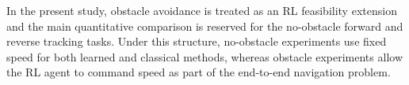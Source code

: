 In the present study, obstacle avoidance is treated as an RL feasibility extension and the main quantitative comparison is reserved for the no-obstacle forward and reverse tracking tasks. Under this structure, no-obstacle experiments use fixed speed for both learned and classical methods, whereas obstacle experiments allow the RL agent to command speed as part of the end-to-end navigation problem.

